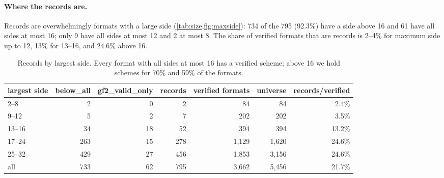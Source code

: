 \paragraph{Where the records are.}
Records are overwhelmingly formats with a large side (\cref{tab:size,fig:maxside}): 734 of the 795 (92.3\%) have a side above 16 and 61 have all sides at most 16; only 9 have all sides at most 12 and 2 at most 8.
The share of verified formats that are records is 2--4\% for maximum side up to 12, 13\% for 13--16, and 24.6\% above 16.
\begin{table}[t]
\centering\small
\begin{tabular}{@{}lrrrrrr@{}}
\toprule
largest side & \textsf{below\_all} & \textsf{gf2\_valid\_only} & records & verified formats & universe & records/verified\\
\midrule
2--8 & 2 & 0 & 2 & 84 & 84 & 2.4\%\\
9--12 & 5 & 2 & 7 & 202 & 202 & 3.5\%\\
13--16 & 34 & 18 & 52 & 394 & 394 & 13.2\%\\
17--24 & 263 & 15 & 278 & 1{,}129 & 1{,}620 & 24.6\%\\
25--32 & 429 & 27 & 456 & 1{,}853 & 3{,}156 & 24.6\%\\
\midrule
all & 733 & 62 & 795 & 3{,}662 & 5{,}456 & 21.7\%\\
\bottomrule
\end{tabular}
\caption{Records by largest side. Every format with all sides at most 16 has a verified scheme; above 16 we hold schemes for 70\% and 59\% of the formats.}
\label{tab:size}
\end{table}

